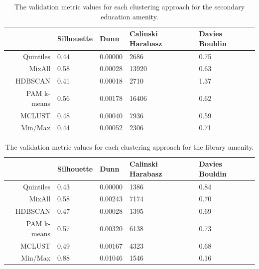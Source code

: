 \documentclass[11pt, a4paper]{article}
\begin{document}
\centering
\begin{longtable}[h]{|r|llll|}
\caption[Secondary education validation metrics]{The validation metric values for each clustering approach for the secondary education amenity.}\label{seceducvalid}
\endfirsthead
\endhead
  \hline
 & Silhouette & Dunn & Calinski Harabasz & Davies Bouldin \\
  \hline
Quintiles & 0.44 & 0.00000 &  2686 & 0.75 \\
   \hline
MixAll & \cellcolor{gray!25} 0.58 & 0.00028 & 13920 & 0.63 \\
   \hline
HDBSCAN & 0.41 & 0.00018 &  2710 & 1.37 \\
   \hline
PAM k-means & 0.56 & \cellcolor{gray!25} 0.00178 & \cellcolor{gray!25} 16406 & 0.62 \\
   \hline
MCLUST & 0.48 & 0.00040 &  7936 & \cellcolor{gray!25} 0.59 \\
   \hline
Min/Max & 0.44 & 0.00052 &  2306 & 0.71 \\
   \hline
\end{longtable}









\centering
\begin{longtable}[h]{|r|llll|}
\caption[Library validation metrics]{The validation metric values for each clustering approach for the library amenity.}\label{libraryvalid}
\endfirsthead
\endhead
 \hline
 & Silhouette & Dunn & Calinski Harabasz & Davies Bouldin \\
  \hline
Quintiles & 0.43 & 0.00000 & 1386 & 0.84 \\
   \hline
MixAll & 0.58 & 0.00243 & \cellcolor{gray!25} 7174 & 0.70 \\
   \hline
HDBSCAN & 0.47 & 0.00028 & 1395 & 0.69 \\
   \hline
PAM k-means & 0.57 & 0.00320 & 6138 & 0.73 \\
   \hline
MCLUST & 0.49 & 0.00167 & 4323 & 0.68 \\
   \hline
Min/Max & \cellcolor{gray!25} 0.88 & \cellcolor{gray!25} 0.01046 & 1546 & \cellcolor{gray!25} 0.16 \\
   \hline
\end{longtable}
\end{document}
